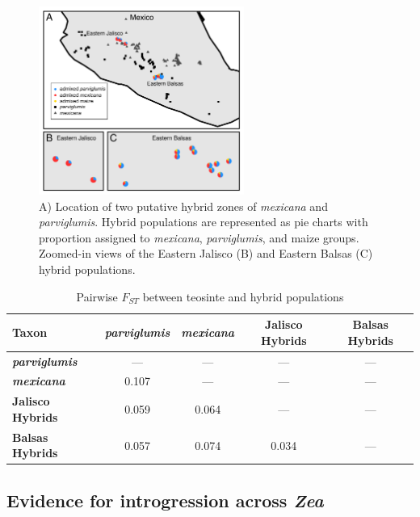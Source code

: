 \begin{figure}[h!]
  \centering
   \includegraphics[width=0.6\textwidth]{map.pdf}
    \caption{A) Location of two putative hybrid zones of \emph{mexicana} and \emph{parviglumis}.  Hybrid populations are represented as pie charts with proportion assigned to \emph{mexicana}, \emph{parviglumis}, and maize groups. Zoomed-in views of the Eastern Jalisco (B) and Eastern Balsas (C) hybrid populations.} 
\label{fig:pies}
\end{figure}

\begin{table}[h!]
\begin{center}
\caption{Pairwise $F_{ST}$ between teosinte and hybrid populations} \label{tab:Fst}
\begin{tabular}{lcccc}\\\toprule
{\bf Taxon}&{\bf \emph{parviglumis}}&{\bf \emph{mexicana}}&{\bf Jalisco Hybrids}&{\bf Balsas Hybrids}\\\midrule
{\bf \emph{parviglumis}}&---&---&---&---\\
{\bf \emph{mexicana}}&0.107&---&---&---\\
{\bf Jalisco Hybrids}&0.059&0.064&---&---\\
{\bf Balsas Hybrids}&0.057&0.074&0.034&---\\\bottomrule
\end{tabular}
\end{center}
\end{table} 

\subsection*{Evidence for introgression across \emph{Zea}}

